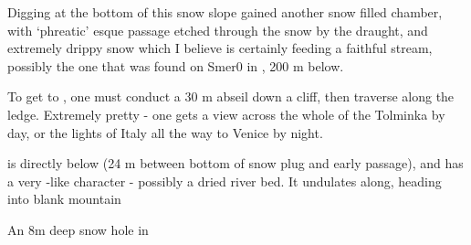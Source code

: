 Digging at the bottom of this snow slope gained another snow filled chamber, with `phreatic' esque passage etched through the snow by the draught, and extremely drippy snow which I believe is certainly feeding a faithful stream, possibly the one that was found on Smer0 in , 200 m below. 

To get to , one must conduct a 30
m abseil down a cliff, then traverse along the ledge. Extremely pretty - one gets a view across the whole of the Tolminka by day, or the lights of Italy all the way to Venice by night.

 is directly below  (24 m between bottom of snow
plug and early passage), and has a very -like character -
possibly a dried river bed. It undulates along, heading into blank
mountain

\begin{marginfigure}
\caption{An 8m deep snow hole in  }
\end{marginfigure}

